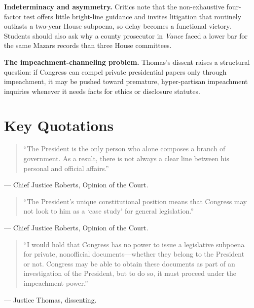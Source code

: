 \documentclass[12pt]{article}
\begin{document}
\textbf{Indeterminacy and asymmetry.} Critics note that the non-exhaustive four-factor test offers little bright-line guidance and invites litigation that routinely outlasts a two-year House subpoena, so delay becomes a functional victory. Students should also ask why a county prosecutor in \textit{Vance} faced a lower bar for the same Mazars records than three House committees.

\textbf{The impeachment-channeling problem.} Thomas's dissent raises a structural question: if Congress can compel private presidential papers only through impeachment, it may be pushed toward premature, hyper-partisan impeachment inquiries whenever it needs facts for ethics or disclosure statutes.

\section{Key Quotations}

\begin{quote}
``The President is the only person who alone composes a branch of government. As a result, there is not always a clear line between his personal and official affairs.''
\end{quote}
\noindent --- Chief Justice Roberts, Opinion of the Court.

\begin{quote}
``The President's unique constitutional position means that Congress may not look to him as a `case study' for general legislation.''
\end{quote}
\noindent --- Chief Justice Roberts, Opinion of the Court.

\begin{quote}
``I would hold that Congress has no power to issue a legislative subpoena for private, nonofficial documents---whether they belong to the President or not. Congress may be able to obtain these documents as part of an investigation of the President, but to do so, it must proceed under the impeachment power.''
\end{quote}
\noindent --- Justice Thomas, dissenting.
\end{document}
